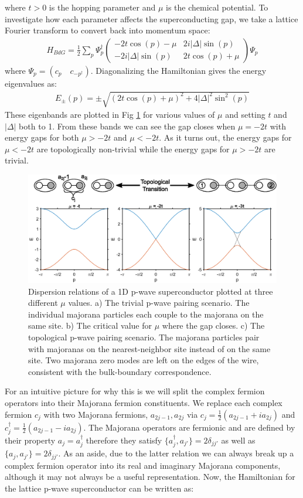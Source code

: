 where $t>0$ is the hopping parameter and $\mu$ is the chemical potential. To investigate how each parameter affects the superconducting gap, we take a lattice Fourier transform to convert back into momentum space:
\begin{align}
	H_{BdG} = \frac{1}{2}\sum_{p}\Psi_{p}^{\dagger}
	\begin{pmatrix}
		-2t\cos(p)-\mu & 2i|\Delta|\sin(p)\\
		-2i|\Delta|\sin(p) & 2t\cos(p)+\mu
	\end{pmatrix}
	\Psi_{p}
\end{align}
where $\Psi_{p}=(c_{p}\quad c_{-p^{\dagger}})$. Diagonalizing the Hamiltonian gives the energy eigenvalues as:
\begin{align}
	E_{\pm}(p) = \pm\sqrt{(2t\cos(p)+\mu)^{2}+4|\Delta|^{2}\sin^{2}(p)}
\end{align}
These eigenbands are plotted in Fig \ref{pwavesc} for various values of $\mu$ and setting $t$ and $|\Delta|$ both to 1. From these bands we can see the gap closes when $\mu=-2t$ with energy gaps for both $\mu>-2t$ and $\mu<-2t$. As it turns out, the energy gaps for $\mu < -2t$ are topologically non-trivial while the energy gaps for $\mu > -2t$ are trivial.
\begin{figure}
	\centering
	\includegraphics[width=\textwidth]{Intro/Figures/PWave_SC.eps}
	\caption{Dispersion relations of a 1D p-wave superconductor plotted at three different $\mu$ values. a) The trivial p-wave pairing scenario. The individual majorana particles each couple to the majorana on the same site. b) The critical value for $\mu$ where the gap closes. c) The topological p-wave pairing scenario. The majorana particles pair with majoranas on the nearest-neighbor site instead of on the same site. Two majorana zero modes are left on the edges of the wire, consistent with the bulk-boundary correspondence.}
	\label{pwavesc}
\end{figure}
For an intuitive picture for why this is we will split the complex fermion operators into their Majorana fermion constituents. We replace each complex fermion $c_{j}$ with two Majorana fermions, $a_{2j-1},a_{2j}$ via $c_{j}=\frac{1}{2}(a_{2j-1}+ia_{2j})$ and $c_{j}^{\dagger}=\frac{1}{2}(a_{2j-1}-ia_{2j})$. The Majorana operators are fermionic and are defined by their property $a_{j}=a_{j}^{\dagger}$ therefore they satisfy $\{a_{j}^{\dagger},a_{j'}\}=2\delta_{jj'}$ as well as $\{a_{j},a_{j'}\}=2\delta_{jj'}$. As an aside, due to the latter relation we can always break up a complex fermion operator into its real and imaginary Majorana components, although it may not always be a useful representation. Now, the Hamiltonian for the lattice p-wave superconductor can be written as:
